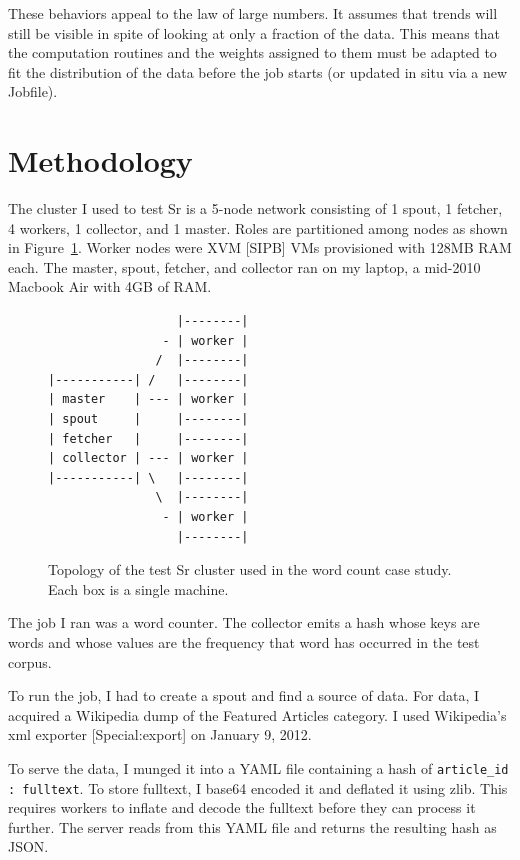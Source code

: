 \documentclass[12pt]{article}
\begin{document}
These behaviors appeal to the law of large numbers. It assumes that trends will still be
visible in spite of looking at only a fraction of the data. This means that the computation
routines and the weights assigned to them must be adapted to fit the distribution of the data
before the job starts (or updated in situ via a new Jobfile).

\section{Methodology}
\label{sec:methodology}
The cluster I used to test Sr is a 5-node network consisting of 1 spout, 1 fetcher, 4 workers,
1 collector, and 1 master. Roles are partitioned among nodes as shown in
Figure~\ref{fig:clusterDiagram}. Worker nodes were XVM [SIPB] VMs provisioned with 128MB RAM each.
The master, spout, fetcher, and collector ran on my laptop, a mid-2010 Macbook Air with 4GB of RAM.

\begin{figure}
\begin{verbatim}
                  |--------|
                - | worker |
               /  |--------|
|-----------| /   |--------|
| master    | --- | worker |
| spout     |     |--------|
| fetcher   |     |--------|
| collector | --- | worker |
|-----------| \   |--------|
               \  |--------|
                - | worker |
                  |--------|
\end{verbatim}
\caption{Topology of the test Sr cluster used in the word count case study.\\
Each box is a single machine.}
\label{fig:clusterDiagram}
\end{figure}

The job I ran was a word counter. The collector emits a hash whose keys are words and whose
values are the frequency that word has occurred in the test corpus.

To run the job, I had to create a spout and find a source of data. For data, I acquired a
Wikipedia dump of the Featured Articles category. I used Wikipedia’s xml exporter
[Special:export] on January 9, 2012.

To serve the data, I munged it into a YAML file containing a hash of
\lstinline[language=Ruby]{article_id : fulltext}. To store fulltext, I base64 encoded it and
deflated it using zlib. This requires workers to inflate and decode the fulltext before they
can process it further. The server reads from this YAML file and returns the resulting hash as
JSON.
\end{document}
